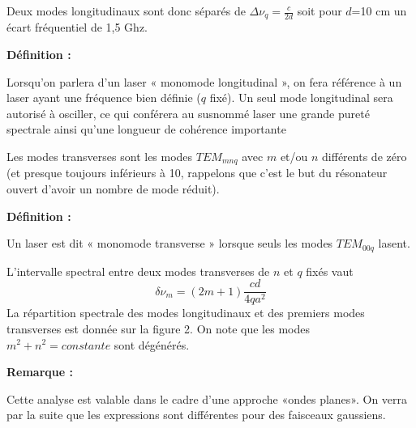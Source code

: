 \documentclass{book}
\begin{document}
Deux modes longitudinaux sont donc séparés de $\Delta \nu_q = \frac c {2d}$ soit pour $d$=10 cm un écart fréquentiel de 1,5 Ghz.

\textbf{\color{definition1}Définition :}  
\begin{mdframed}[linecolor=definition1, backgroundcolor=definition2]
Lorsqu'on parlera d'un laser « monomode longitudinal », on fera référence à un laser ayant une fréquence bien définie ($q$ fixé). Un seul mode longitudinal sera autorisé à osciller, ce qui conférera au susnommé laser une grande pureté spectrale ainsi qu'une longueur de cohérence importante
\end{mdframed}

Les modes transverses sont les modes $TEM_{mnq}$ avec $m$ et/ou $n$ différents de zéro (et presque toujours inférieurs à 10, rappelons que c'est le but du résonateur ouvert d'avoir un nombre de mode réduit).

\textbf{\color{definition1}Définition :}  
\begin{mdframed}[linecolor=definition1, backgroundcolor=definition2]
Un laser est dit « monomode transverse » lorsque seuls les modes $TEM_{00q}$ lasent.
\end{mdframed}


L'intervalle spectral entre deux modes transverses de $n$ et $q$ fixés vaut $$\delta\nu_m =
            (2m+1)\frac{cd}{4qa^2}$$ 
La répartition spectrale des modes longitudinaux et des premiers modes transverses est donnée sur la figure 2. On note que les modes $m^2+n^2=constante$ sont dégénérés.

\textbf{\color{remarque1}Remarque :}  
\begin{mdframed}[linecolor=remarque1, backgroundcolor=remarque2]
Cette analyse est valable dans le cadre d'une approche «ondes planes». On verra par la suite que les expressions sont différentes pour des faisceaux gaussiens.
\end{mdframed}
\end{document}
